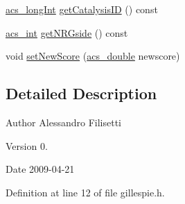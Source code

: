 \begin{DoxyCompactItemize}
\item 
\hyperlink{a00050_a19319d75f02db4308bc5c0026d98cd85}{acs\+\_\+long\+Int} \hyperlink{a00014_a0f2202c3d3662ce7cec6b127f066f715}{get\+Catalysis\+I\+D} () const 
\item 
\hyperlink{a00050_a8d277355641a098190360234e2ebde35}{acs\+\_\+int} \hyperlink{a00014_ad668afc14941b6842c703046a1a2d4c1}{get\+N\+R\+Gside} () const 
\item 
void \hyperlink{a00014_a43ac16698f9e047c7384b4219f9e5e86}{set\+New\+Score} (\hyperlink{a00050_ab776853a005fcbf56af0424a2a4dd607}{acs\+\_\+double} newscore)
\end{DoxyCompactItemize}


\subsection{Detailed Description}
\begin{DoxyAuthor}{Author}
Alessandro Filisetti 
\end{DoxyAuthor}
\begin{DoxyVersion}{Version}
0. 
\end{DoxyVersion}
\begin{DoxyDate}{Date}
2009-\/04-\/21 
\end{DoxyDate}


Definition at line 12 of file gillespie.\+h.



